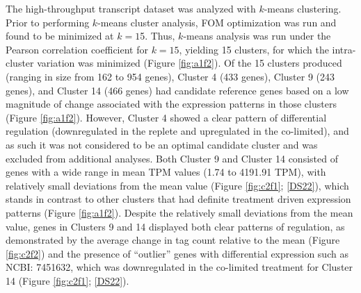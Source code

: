 The high-throughput transcript dataset was analyzed with $k$-means clustering. Prior to performing $k$-means cluster analysis, FOM optimization was run and found to be minimized at $k=1$5. Thus, $k$-means analysis was run under the Pearson correlation coefficient for $k=15$, yielding 15 clusters, for which the intra-cluster variation was minimized (Figure \ref{fig:a1f2}). Of the 15 clusters produced (ranging in size from 162 to 954 genes), Cluster 4 (433 genes), Cluster 9 (243 genes), and Cluster 14 (466 genes) had candidate reference genes based on a low magnitude of change associated with the expression patterns in those clusters (Figure \ref{fig:a1f2}). However, Cluster 4 showed a clear pattern of differential regulation (downregulated in the replete and upregulated in the co-limited), and as such it was not considered to be an optimal candidate cluster and was excluded from additional analyses. Both Cluster 9 and Cluster 14 consisted of genes with a wide range in mean TPM values (1.74 to 4191.91 TPM), with relatively small deviations from the mean value (Figure \ref{fig:c2f1}; \ref{DS22}), which stands in contrast to other clusters that had definite treatment driven expression patterns (Figure  \ref{fig:a1f2}). Despite the relatively small deviations from the mean value, genes in Clusters 9 and 14 displayed both clear patterns of regulation, as demonstrated by the average change in tag count relative to the mean (Figure \ref{fig:c2f2}) and the presence of ``outlier'' genes with differential expression such as NCBI: 7451632, which was downregulated in the co-limited treatment for Cluster 14 (Figure \ref{fig:c2f1}; \ref{DS22}). \par

